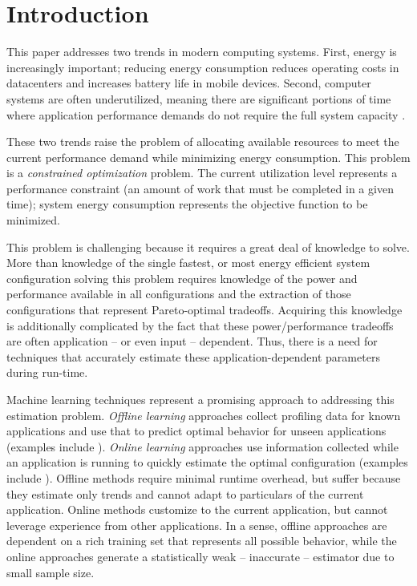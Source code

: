 
\section{Introduction}

This paper addresses two trends in modern computing systems.  First,
energy is increasingly important; reducing energy consumption reduces
operating costs in datacenters and increases battery life in mobile
devices.  Second, computer systems are often underutilized, meaning
there are significant portions of time where application performance
demands do not require the full system capacity
\cite{google2007,MeisnerISCA2011}.

These two trends raise the problem of allocating available resources
to meet the current performance demand while minimizing energy
consumption. This problem is a \emph{constrained optimization}
problem. The current utilization level represents a performance
constraint (\ie an amount of work that must be completed in a given
time); system energy consumption represents the objective function to
be minimized.

This problem is challenging because it requires a great deal of
knowledge to solve.  More than knowledge of the single fastest, or
most energy efficient system configuration solving this problem
requires knowledge of the power and performance available in all
configurations and the extraction of those configurations that
represent Pareto-optimal tradeoffs.  Acquiring this knowledge is
additionally complicated by the fact that these power/performance
tradeoffs are often application -- or even input -- dependent.  Thus,
there is a need for techniques that accurately estimate these
application-dependent parameters during run-time.

Machine learning techniques represent a promising approach to
addressing this estimation problem.  \emph{Offline learning}
approaches collect profiling data for known applications and use that
to predict optimal behavior for unseen applications (examples include
\cite{Yi2003,Koala,LeeBrooks2006,CPR,ChenJohn2011}).  \emph{Online
  learning} approaches use information collected while an application
is running to quickly estimate the optimal configuration (examples
include
\cite{Li2006,Flicker,ParallelismDial,Ponamarev,petabricksDynamic,LeeBrooks,TAAS}).
Offline methods require minimal runtime overhead, but suffer because
they estimate only trends and cannot adapt to particulars of the
current application.  Online methods customize to the current
application, but cannot leverage experience from other applications.
In a sense, offline approaches are dependent on a rich training set
that represents all possible behavior, while the online approaches
generate a statistically weak -- \ie inaccurate -- estimator due to
small sample size.
 
